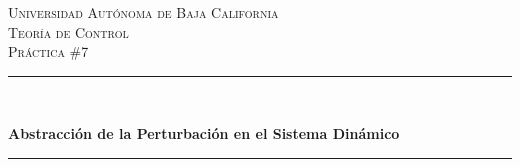 \documentclass[12pt, letterpaper]{article}
\begin{document}

\begin{titlepage} %
	\vspace*{-3cm}
	\hspace*{-2.5cm}
	\newcommand{\HRule}{\rule{\linewidth}{0.5mm}} %
	\center %
	
	
	\textsc{\LARGE Universidad Autónoma de Baja California}\\[1.5cm] %
	
	\textsc{\Large Teoría de Control}\\[0.5cm] %
	
	\textsc{\large Práctica \#7}\\[0.5cm] %
	
	
	\HRule\\[0.4cm]
	
	{\huge\bfseries Abstracción de la Perturbación en el Sistema Dinámico\\[0.4cm] %
	
	\HRule\\[1.5cm]
	
	
}
\end{titlepage}
\end{document}

